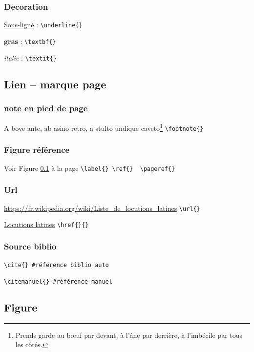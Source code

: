 \subsubsection{Decoration}
\underline{Sous-ligné} : \verb|\underline{}|

\textbf{gras} : \verb|\textbf{}|

\textit{italic} : \verb|\textit{}|



\subsection{Lien -- marque page}\label{sec:lien}
\subsubsection{note en pied de page}
A bove ante, ab asino retro, a stulto undique caveto\footnote{Prends garde au bœuf par devant, à l'âne par derrière, à l'imbécile par tous les côtés.} \verb|\footnote{}|

\subsubsection{Figure référence}

Voir Figure \ref{sec:lien} à la page \pageref{sec:lien}  \verb|\label{} \ref{}  \pageref{}|

\subsubsection{Url}
\url{https://fr.wikipedia.org/wiki/Liste_de_locutions_latines}  \verb|\url{}|

\href{https://fr.wikipedia.org/wiki/Liste_de_locutions_latines}{Locutions latines} \verb|\href{}{}|

\subsubsection{Source biblio}

\cite{agressin} \verb|\cite{} #référence biblio auto|

 \verb|\citemanuel{} #référence manuel|

\subsection{Figure}

